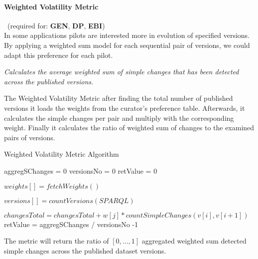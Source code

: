 \paragraph{Weighted Volatility Metric}~(required for: \textbf{GEN}, \textbf{DP}, \textbf{EBI})~\\ %
In some applications pilots are interested more in evolution of specified versions. By applying a weighted sum model \cite{WSM} for each sequential pair of versions, we could adapt this preference for each pilot.

\begin{mdframed}[style=metricdefinition]
\emph{Calculates the average weighted sum of simple changes that has been detected across the published versions.}
\end{mdframed}

The Weighted Volatility Metric after finding the total number of published versions it loads the weights
from the curator's preference table. Afterwards, it calculates the simple changes per pair and multiply with the corresponding weight. Finally it calculates the ratio of weighted sum of changes to the examined pairs of versions.

\begin{algorithm}
\caption{Weighted Volatility Metric Algorithm}
\begin{algorithmic}[1]

\State aggregSChanges = 0
\State versionsNo = 0
\State retValue = 0
\EndProcedure

\State $ weights [] = fetchWeights()$
\EndProcedure

\State $ versions [] = countVersions (SPARQL)$

\State $changesTotal = changesTotal + w[j]*countSimpleChanges(v[i],v[i+1])$
	\EndFor
\EndFor
\EndProcedure
\State retValue = aggregSChanges / versionsNo -1
\end{algorithmic}
\end{algorithm}

The metric will return the ratio of $[0,\ldots,1]$ aggregated weighted sum detected simple changes across the published dataset versions.

